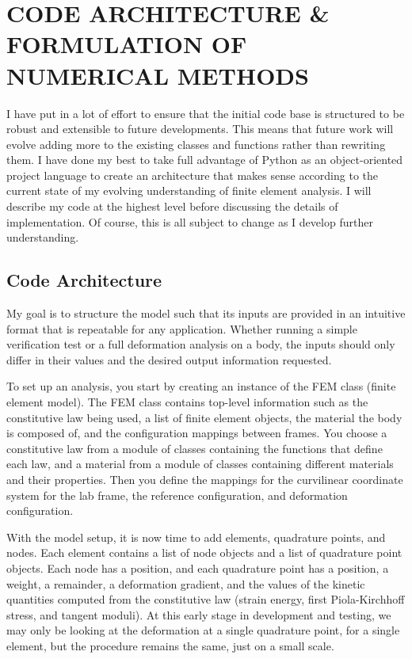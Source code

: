 \documentclass[]{spie}  %
\begin{document}
\section{CODE ARCHITECTURE \& FORMULATION OF NUMERICAL METHODS} 

I have put in a lot of effort to ensure that the initial code base is structured to be robust and extensible to future developments. This means that future work will evolve adding more to the existing classes and functions rather than rewriting them. I have done my best to take full advantage of Python as an object-oriented project language to create an architecture that makes sense according to the current state of my evolving understanding of finite element analysis. I will describe my code at the highest level before discussing the details of implementation. Of course, this is all subject to change as I develop further understanding. 

\subsection{Code Architecture}

My goal is to structure the model such that its inputs are provided in an intuitive format that is repeatable for any application. Whether running a simple verification test or a full deformation analysis on a body, the inputs should only differ in their values and the desired output information requested.

To set up an analysis, you start by creating an instance of the FEM class (finite element model). The FEM class contains top-level information such as the constitutive law being used, a list of finite element objects, the material the body is composed of, and the configuration mappings between frames. You choose a constitutive law from a module of classes containing the functions that define each law, and a material from a module of classes containing different materials and their properties. Then you define the mappings for the curvilinear coordinate system for the lab frame, the reference configuration, and deformation configuration. 

With the model setup, it is now time to add elements, quadrature points, and nodes. Each element contains a list of node objects and a list of quadrature point objects. Each node has a position, and each quadrature point has a position, a weight, a remainder, a deformation gradient, and the values of the kinetic quantities computed from the constitutive law (strain energy, first Piola-Kirchhoff stress, and tangent moduli). At this early stage in development and testing, we may only be looking at the deformation at a single quadrature point, for a single element, but the procedure remains the same, just on a small scale. 
\end{document}
